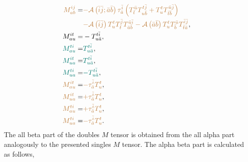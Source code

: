 \documentclass[a4paper,12pt,oneside]{book}
\newcommand{\brown}[1]{{\color{brown} #1}}
\newcommand{\green}[1]{{\color{pinegreen} #1}}
\newcommand{\asop}[1]{{\cal A}\left(#1\right)}
\newcommand{\ASop}[2]{{\cal A}\left(#1;#2\right)}
\newcommand{\spa}[1]{{#1}}
\newcommand{\spb}[1]{\bar{#1}}
\begin{document}
\begin{align}
\brown{M^{\spa{i}\spa{j}}_{\spa{a}\spa{b}}} = &\brown{-\ASop{\spb{i}\spb{j}}{\spb{a}\spb{b}} \tau^{\spb{i}}_{\spb{a}} \left( T^{\spb{u}}_{\spb{t}} T^{\spa{t}\spb{j}}_{\spa{u}\spb{b}}
                                                      +T^{\spa{t}}_{\spa{u}} T^{\spb{u}\spb{j}}_{\spb{t}\spb{b}}\right)} \nonumber \\ 
                                              &\brown{-\asop{\spb{i}\spb{j}} T^{\spa{t}}_{\spa{u}} T^{\spb{j}}_{\spb{t}} T^{\spb{u}\spb{i}}_{\spb{a}\spb{b}}
                                              -\asop{\spb{a}\spb{b}} T^{\spa{t}}_{\spa{u}} T^{\spb{u}}_{\spb{b}} T^{\spb{i}\spb{j}}_{\spb{t}\spb{a}}},\\
M^{\spa{i}\spa{t}}_{\spa{a}\spa{u}}         = &-T^{\spa{t}\spb{i}}_{\spa{u}\spb{a}}, \\
\green{M^{\spa{t}\spa{i}}_{\spa{a}\spa{u}}} = &\green{T^{\spa{t}\spb{i}}_{\spa{u}\spb{a}}}, \\
\green{M^{\spa{i}\spa{t}}_{\spa{u}\spa{a}}} = &\green{T^{\spa{t}\spb{i}}_{\spa{u}\spb{a}}}, \\
\green{M^{\spa{t}\spa{i}}_{\spa{u}\spa{a}}} = &\green{-T^{\spa{t}\spb{i}}_{\spa{u}\spb{a}}}, \\
\brown{M^{\spa{i}\spa{t}}_{\spa{a}\spa{u}}} = &\brown{-\tau^{\spb{i}}_{\spb{a}} T^{\spa{t}}_{\spa{u}}}, \\
\brown{M^{\spa{i}\spa{t}}_{\spa{u}\spa{a}}} = &\brown{+\tau^{\spb{i}}_{\spb{a}} T^{\spa{t}}_{\spa{u}}}, \\
\brown{M^{\spa{t}\spa{i}}_{\spa{a}\spa{u}}} = &\brown{+\tau^{\spb{i}}_{\spb{a}} T^{\spa{t}}_{\spa{u}}}, \\
\brown{M^{\spa{t}\spa{i}}_{\spa{u}\spa{a}}} = &\brown{-\tau^{\spb{i}}_{\spb{a}} T^{\spa{t}}_{\spa{u}}}.
\end{align}
The all beta part of the doubles $M$ tensor is obtained from the all alpha part analogously to the presented singles $M$ tensor. \newline
The alpha beta part is calculated as follows,
\end{document}
